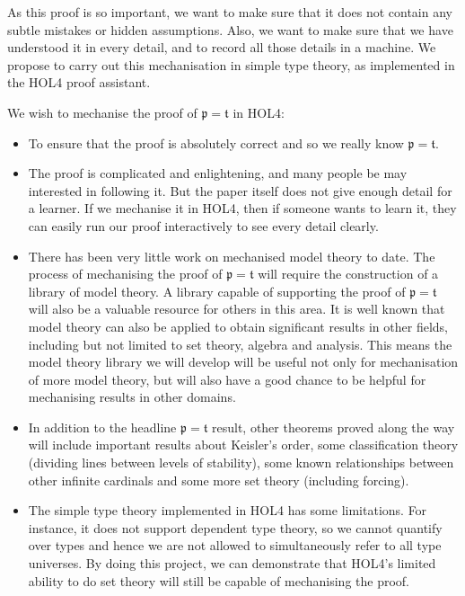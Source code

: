 \documentclass[11pt]{article}
\theoremstyle{definition}
\begin{document}
As this proof is so important, we want to make sure that it does not contain any subtle mistakes or hidden assumptions. Also, we want to make sure that we have understood it in every detail, and to record all those details in a machine. We propose to carry out this mechanisation in simple type theory, as implemented in the HOL4 proof assistant.


We wish to mechanise the proof of $\mathfrak p=\mathfrak t$ in HOL4:

\begin{itemize}

\item To ensure that the proof is absolutely correct and so we really know $\mathfrak p=\mathfrak t$. 

\item The proof is complicated and enlightening, and many people be may interested in following it. But the paper itself does not give enough detail for a learner. If we mechanise it in HOL4, then if someone wants to learn it, they can easily run our proof interactively to see every detail clearly.

\item There has been very little work on mechanised model theory to date. The process of mechanising the proof of $\mathfrak p=\mathfrak t$  will require the construction of a library of model theory. A library capable of supporting the proof of $\mathfrak p=\mathfrak t$  will also be a valuable resource for others in this area. It is well known that model theory can also be applied to obtain significant results in other fields, including but not limited to set theory, algebra and analysis. This means the model theory library we will develop will be useful not only for mechanisation of more model theory, but will also have a good chance to be helpful for mechanising results in other domains. 

\item In addition to the headline $\mathfrak p=\mathfrak t$ result, other theorems proved along the way will include important results about Keisler's order, some classification theory (dividing lines between levels of stability), some known relationships between other infinite cardinals and some more set theory (including forcing). 

\item The simple type theory implemented in HOL4 has some limitations. For instance, it does not support dependent type theory, so we cannot quantify over types and hence we are not allowed to simultaneously refer to all type universes. By doing this project, we can demonstrate that HOL4's limited ability to do set theory will still be capable of mechanising the proof.


\end{itemize}
\end{document}
